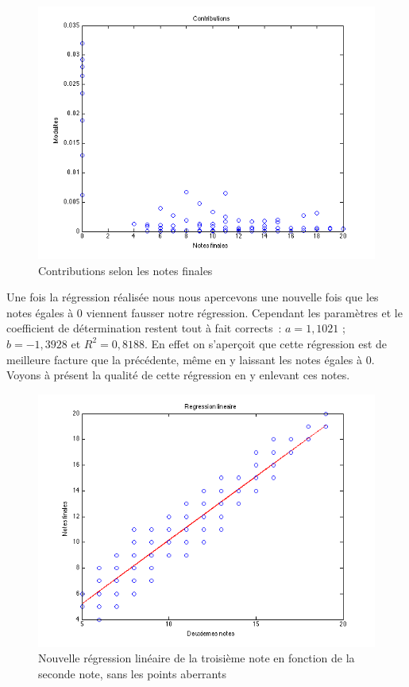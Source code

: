 \documentclass[11pt]{article}
\begin{document}
\begin{figure}[h]
\centering
\includegraphics[scale=0.55]{Images/fig15.png}
\caption{Contributions selon les notes finales}
\end{figure}

\FloatBarrier
Une fois la régression réalisée nous nous apercevons une nouvelle fois que les notes égales à 0 viennent fausser notre régression. Cependant les paramètres et le coefficient de détermination restent tout à fait corrects : $a=1,1021$ ; $b=-1,3928$ et  $R^2=0,8188$. En effet on s'aperçoit que cette régression est de meilleure facture que la précédente, même en y laissant les notes égales à 0. Voyons à présent la qualité de cette régression en y enlevant ces notes.

\begin{figure}[h]
\centering
\includegraphics[scale=0.5]{Images/fig16.png}
\caption{Nouvelle régression linéaire de la troisième note en fonction de la seconde note, sans les points aberrants}
\end{figure}
\end{document}
